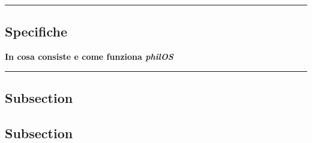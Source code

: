 {\color{gray}\hrule}
\begin{center}
\section{Specifiche}
\textbf{In cosa consiste e come funziona \textit{philOS}}
\bigskip
\end{center}
{\color{gray}\hrule}

\subsection{Subsection}
\lipsum[1]
\subsection{Subsection}
\lipsum[1-3]

\pagebreak
